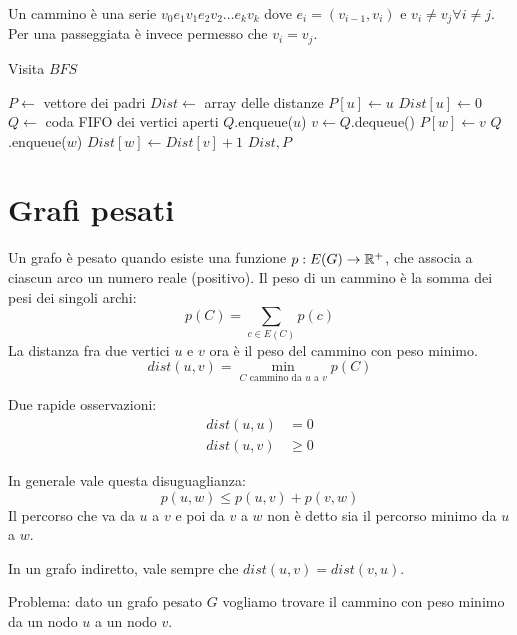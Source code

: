 \begin{defn}
Un cammino \`e una serie $v_0 e_1 v_1 e_2 v_2 \ldots e_k v_k$ dove $e_i = (v_{i-1}, v_i)$ e $v_i \neq v_j \forall i \neq j$. Per una passeggiata \`e invece permesso che $v_i = v_j$.
\end{defn}

\begin{algorithm}
\caption{Visita $BFS$}
\begin{algorithmic}[1]
    \State $P \gets$ vettore dei padri
    \State $Dist \gets$ array delle distanze
    \State $P[u] \gets u$
    \State $Dist[u] \gets 0$
    \State $Q \gets$ coda FIFO dei vertici aperti
    \State $Q$.enqueue($u$)
        \State $v \gets Q$.dequeue()
                \State $P[w] \gets v$
                \State $Q$.enqueue($w$)
                \State $Dist[w] \gets Dist[v] + 1$
            \EndIf
        \EndFor
    \EndWhile
    \State \Return $Dist, P$
\EndFunction
\end{algorithmic}
\end{algorithm}

\section{Grafi pesati}

Un grafo \`e pesato quando esiste una funzione $p : E(G) \to \mathbb{R}^{+}$, che associa a ciascun arco un numero reale (positivo). Il peso di un cammino \`e la somma dei pesi dei singoli archi:
\[
p(C) = \sum_{c \in E(C)} p(c)
\]
La distanza fra due vertici $u$ e $v$ ora \`e il peso del cammino con peso minimo.
\[
dist(u,v) = \min_{C \text{ cammino da } u \text{ a } v} p(C)
\]
\begin{oss}
Due rapide osservazioni:
\begin{align*}
dist(u,u) & = 0 \\
dist(u,v) & \ge 0
\end{align*}
\end{oss}

In generale vale questa disuguaglianza:
\[
p(u,w) \le p(u,v) + p(v,w)
\]
Il percorso che va da $u$ a $v$ e poi da $v$ a $w$ non \`e detto sia il percorso minimo da $u$ a $w$.

In un grafo indiretto, vale sempre che $dist(u,v) = dist(v,u)$.

Problema: dato un grafo pesato $G$ vogliamo trovare il cammino con peso minimo da un nodo $u$ a un nodo $v$.

